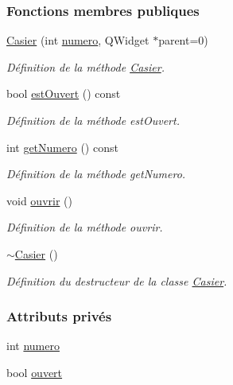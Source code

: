 \subsubsection*{Fonctions membres publiques}
\begin{DoxyCompactItemize}
\item 
\hyperlink{class_casier_aed1cd4435ff913a68b69d8119481bb8f}{Casier} (int \hyperlink{class_casier_a17aa23e73b177559266a9fb17f63b812}{numero}, Q\+Widget $\ast$parent=0)
\begin{DoxyCompactList}\small\item\em Définition de la méthode \hyperlink{class_casier}{Casier}. \end{DoxyCompactList}\item 
bool \hyperlink{class_casier_ab26fd4da845423355835da8d445ed5dd}{est\+Ouvert} () const
\begin{DoxyCompactList}\small\item\em Définition de la méthode est\+Ouvert. \end{DoxyCompactList}\item 
int \hyperlink{class_casier_a061b024a2733a5bb1dfcc43bb0022707}{get\+Numero} () const
\begin{DoxyCompactList}\small\item\em Définition de la méthode get\+Numero. \end{DoxyCompactList}\item 
void \hyperlink{class_casier_ac4b0de3ba58dc2bab52b049b278f4f90}{ouvrir} ()
\begin{DoxyCompactList}\small\item\em Définition de la méthode ouvrir. \end{DoxyCompactList}\item 
\hyperlink{class_casier_a4aebc2219ccd4612cf79413904bb9340}{$\sim$\+Casier} ()
\begin{DoxyCompactList}\small\item\em Définition du destructeur de la classe \hyperlink{class_casier}{Casier}. \end{DoxyCompactList}\end{DoxyCompactItemize}
\subsubsection*{Attributs privés}
\begin{DoxyCompactItemize}
\item 
int \hyperlink{class_casier_a17aa23e73b177559266a9fb17f63b812}{numero}
\item 
bool \hyperlink{class_casier_afe544ed1a87ce714a9fbbe16126669e4}{ouvert}
\end{DoxyCompactItemize}


